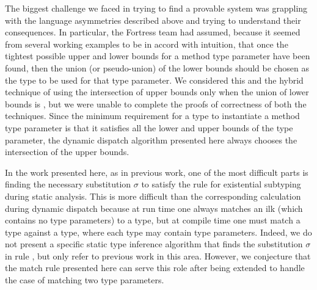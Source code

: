 The biggest challenge we faced in trying to find a provable system was
grappling with the language asymmetries described above and trying to
understand their consequences.  In particular, the Fortress team had
assumed, because it seemed from several working examples to be in accord
with intuition, that once the tightest possible upper and lower bounds
for a method type parameter have been found, then the union
(or pseudo-union) of the lower bounds should be chosen as the type to be used for that type parameter.
We considered this and the hybrid technique of using the intersection of upper bounds only when
the union of lower bounds is \Bottom, but we were unable to
complete the proofs of correctness of both the techniques.
Since the minimum requirement for a type to instantiate a method type parameter
is that it satisfies all the lower and upper bounds of the type parameter,
the dynamic dispatch algorithm presented here always chooses
the intersection of the upper bounds.

In the work presented here, as in previous work, one of the most difficult parts
is finding the necessary substitution $\sigma$ to satisfy the rule  for existential
subtyping during static analysis.  This is more difficult than the corresponding calculation
during dynamic dispatch because at run time one always matches an ilk (which contains no
type parameters) to a type, but at compile time one must match a type against a type,
where each type may contain type parameters.
Indeed, we do not present a specific static type inference
algorithm that finds the substitution $\sigma$ in rule ,
but only refer to previous work in this area.
However, we conjecture that the \textsf{match} rule presented here can
serve this role after being extended to handle the case of matching
two type parameters.
